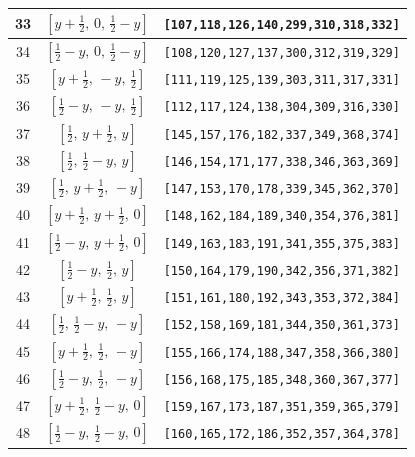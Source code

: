 \documentclass[fleqn,8pt]{jsarticle}
\begin{document}
\begin{longtable}{ccc}
33 & $\left[ y + \frac{1}{2},\, 0,\, \frac{1}{2} - y \right]$ & {\tt [107,118,126,140,299,310,318,332]} \\ \hline
34 & $\left[ \frac{1}{2} - y,\, 0,\, \frac{1}{2} - y \right]$ & {\tt [108,120,127,137,300,312,319,329]} \\ \hline
35 & $\left[ y + \frac{1}{2},\, - y,\, \frac{1}{2} \right]$ & {\tt [111,119,125,139,303,311,317,331]} \\ \hline
36 & $\left[ \frac{1}{2} - y,\, - y,\, \frac{1}{2} \right]$ & {\tt [112,117,124,138,304,309,316,330]} \\ \hline
37 & $\left[ \frac{1}{2},\, y + \frac{1}{2},\, y \right]$ & {\tt [145,157,176,182,337,349,368,374]} \\ \hline
38 & $\left[ \frac{1}{2},\, \frac{1}{2} - y,\, y \right]$ & {\tt [146,154,171,177,338,346,363,369]} \\ \hline
39 & $\left[ \frac{1}{2},\, y + \frac{1}{2},\, - y \right]$ & {\tt [147,153,170,178,339,345,362,370]} \\ \hline
40 & $\left[ y + \frac{1}{2},\, y + \frac{1}{2},\, 0 \right]$ & {\tt [148,162,184,189,340,354,376,381]} \\ \hline
41 & $\left[ \frac{1}{2} - y,\, y + \frac{1}{2},\, 0 \right]$ & {\tt [149,163,183,191,341,355,375,383]} \\ \hline
42 & $\left[ \frac{1}{2} - y,\, \frac{1}{2},\, y \right]$ & {\tt [150,164,179,190,342,356,371,382]} \\ \hline
43 & $\left[ y + \frac{1}{2},\, \frac{1}{2},\, y \right]$ & {\tt [151,161,180,192,343,353,372,384]} \\ \hline
44 & $\left[ \frac{1}{2},\, \frac{1}{2} - y,\, - y \right]$ & {\tt [152,158,169,181,344,350,361,373]} \\ \hline
45 & $\left[ y + \frac{1}{2},\, \frac{1}{2},\, - y \right]$ & {\tt [155,166,174,188,347,358,366,380]} \\ \hline
46 & $\left[ \frac{1}{2} - y,\, \frac{1}{2},\, - y \right]$ & {\tt [156,168,175,185,348,360,367,377]} \\ \hline
47 & $\left[ y + \frac{1}{2},\, \frac{1}{2} - y,\, 0 \right]$ & {\tt [159,167,173,187,351,359,365,379]} \\ \hline
48 & $\left[ \frac{1}{2} - y,\, \frac{1}{2} - y,\, 0 \right]$ & {\tt [160,165,172,186,352,357,364,378]} \\
\end{longtable}
\renewcommand{\arraystretch}{1.2}
\end{document}
